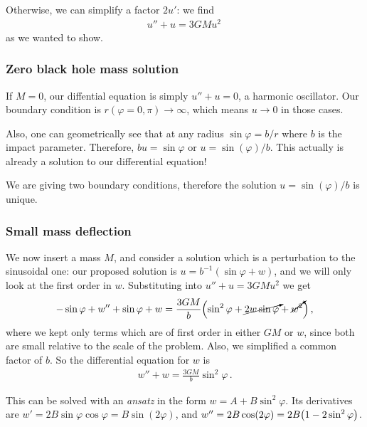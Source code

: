 \documentclass[main.tex]{subfiles}
\begin{document}
Otherwise, we can simplify a factor \(2 u'\): we find 
%
\begin{align}
  u'' + u = 3 GMu^2
\,
\end{align}
%
as we wanted to show. 

\subsubsection{Zero black hole mass solution}

If \(M=0\), our diffential equation is simply \(u''+u=0\), a harmonic oscillator.
Our boundary condition is \(r (\varphi = 0, \pi ) \rightarrow \infty \), which means \(u \rightarrow 0\) in those cases. 

Also, one can geometrically see that at any radius \(\sin \varphi = b/r\) where \(b\) is the impact parameter.
Therefore, \(bu = \sin \varphi \) or \(u = \sin(\varphi ) / b \). This actually is already a solution to our differential equation! 

We are giving two boundary conditions, therefore the solution \(u = \sin(\varphi ) / b \) is unique. 

\subsubsection{Small mass deflection}

We now insert a mass \(M\), and consider a solution which is a perturbation to the sinusoidal one: our proposed solution is \(u = b^{-1} (\sin \varphi + w)\), and we will only look at the first order in \(w\). Substituting into \(u'' + u = 3GM u^2\) we get 
%
\begin{align}
  - \sin \varphi + w'' + \sin \varphi + w = \frac{3GM}{b} \qty(\sin^2 \varphi + \cancelto{}{2w  \sin \varphi} + \cancelto{}{w^2})
\,,
\end{align}
%
where we kept only terms which are of first order in either \(GM\) or \(w\), since both are small relative to the scale of the problem. Also, we simplified a common factor of \(b\).
So the differential equation for \(w\) is 
%
\begin{align}
  w'' + w = \frac{3GM}{b} \sin^2 \varphi 
\,.
\end{align}

This can be solved with an \emph{ansatz} in the form \(w = A + B \sin^2\varphi\).
Its derivatives are \(w' = 2B \sin \varphi \cos \varphi = B \sin(2\varphi )\), and \(w'' = 2B \cos(2 \varphi )= 2 B \qty(1 - 2\sin^2\varphi )\). 
\end{document}

